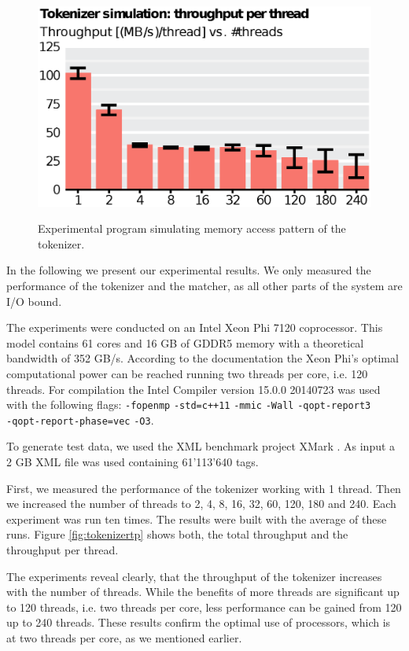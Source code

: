 \begin{figure}
    \includegraphics[scale=.45]{img/def/tokenizer_sim.eps} 
    \label{fig:tokenizersim}
    \caption{Experimental program simulating memory access pattern of the
    tokenizer.}
\end{figure}


In the following we present our experimental results. We only measured the
performance of the tokenizer and the matcher, as all other parts of the system
are I/O bound.

 The experiments were conducted on an Intel Xeon Phi
7120 coprocessor. This model contains 61 cores and 16 GB of GDDR5 memory with a
theoretical bandwidth of 352 GB/s. According to the documentation the Xeon Phi's
optimal computational power can be reached running two threads per core, i.e.
120 threads. For compilation the Intel Compiler version 15.0.0 20140723 was used
with the following flags: \verb;-fopenmp; \verb;-std=c++11; \verb;-mmic;
\verb;-Wall; \verb;-qopt-report3; \\ \verb;-qopt-report-phase=vec; \verb;-O3;.

To generate test data, we used the XML benchmark project XMark
\cite{Schmidt2002}. As input a 2 GB XML file was used containing 61'113'640
tags. 

 First, we measured the performance of the tokenizer working
with 1 thread. Then we increased the number of threads to 2, 4, 8, 16, 32, 60,
120, 180 and 240.  Each experiment was run ten times. The results were built
with the average of these runs. Figure \ref{fig:tokenizertp} shows both, the
total throughput and the throughput per thread.

The experiments reveal clearly, that the throughput of the tokenizer increases
with the number of threads. While the benefits of more threads are significant
up to 120 threads, i.e. two threads per core, less performance can be gained
from 120 up to 240 threads. These results confirm the optimal use of processors,
which is at two threads per core, as we mentioned earlier.

